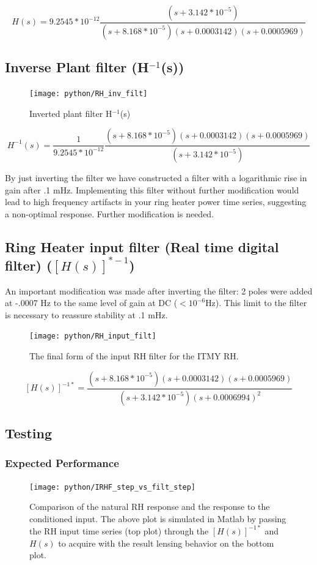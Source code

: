 \documentclass[colorlinks=true,pdfstartview=FitV,linkcolor=blue,
            citecolor=magenta,urlcolor=red]{ligodoc}
\begin{document}
$$ H(s) = 9.2545*10^{-12} \frac{(s+3.142*10^{-5})}{(s+ 8.168*10^{-5}) (s+0.0003142) (s+0.0005969)} $$


\subsection{Inverse Plant filter (H$^{-1}$(s))}
\begin{figure}[H]
\texttt{[image: python/RH\_inv\_filt]}
\caption{Inverted plant filter H$^{-1}$(s)}
\label{fig:inv_plant_filt}
\end{figure}

$$ H^{-1}(s) = \frac{1}{9.2545*10^{-12}} \frac{(s+ 8.168*10^{-5}) (s+0.0003142) (s+0.0005969)}{(s+3.142*10^{-5})} $$

By just inverting the filter we have constructed a filter with a logarithmic rise in gain after .1 mHz. Implementing this filter without further modification would lead to high frequency artifacts in your ring heater power time series, suggesting a non-optimal response. Further modification is needed.

\newpage

\subsection{Ring Heater input filter (Real time digital filter) ($[H(s)]^{*-1}$)}
An important modification was made after inverting the filter: 2 poles were added at -.0007 Hz to the same level of gain at DC ($<10^{-6}$Hz). This limit to the filter is necessary to reassure stability at .1 mHz.

\begin{figure}[H]
\texttt{[image: python/RH\_input\_filt]}
\caption{The final form of the input RH filter for the ITMY RH.}
\label{fig:inv_plant_filt_mod}
\end{figure}

$$ [H(s)]^{-1*} = \frac{(s+8.168*10^{-5}) (s+0.0003142) (s+0.0005969)}{(s+3.142*10^{-5}) (s+0.0006994)^2} $$


\newpage
\subsection{Testing}
\subsubsection{Expected Performance}

\begin{figure}[H]
\texttt{[image: python/IRHF\_step\_vs\_filt\_step]}
\caption{Comparison of the natural RH response and the response to the conditioned input. The above plot is simulated in Matlab by passing the RH input time series (top plot) through the $[H(s)]^{-1*}$ and $H(s)$ to acquire with the result lensing behavior on the bottom plot.}
\label{fig:comparison}
\end{figure}
\end{document}
